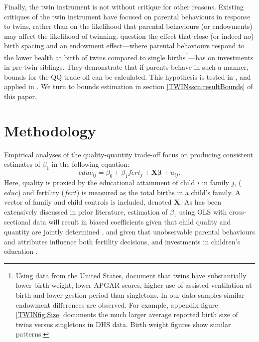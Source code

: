Finally, the twin instrument is not without critique for other reasons. Existing
critiques of the twin instrument have focused on parental behaviours in response 
to twins, rather than on the likelihood that parental behaviours (or endowments) 
may affect the likelihood of twinning. \citet{RosenzweigZhang2009} question the 
effect that close (or indeed no) birth spacing and an endowment effect---where 
parental behaviours respond to the lower health at birth of twins compared to 
single births\footnote{Using data from the United States, \citet{Almondetal2005} 
document that twins have substantially lower birth weight, lower APGAR scores, 
higher use of assisted ventilation at birth and lower gestion period than 
singletons. In our data samples similar endowment differences are observed. For
example, appendix figure \ref{TWINfig:Size} documents the much larger average 
reported birth size of twins versus singletons in DHS data. Birth weight figures 
show similar patterns.}---has on investments in pre-twin siblings. They 
demonstrate that if parents behave in such a manner, bounds for the QQ 
trade-off can be calculated. This hypothesis is tested in 
\citet{Angristetal2010}, and applied in \citet{FitzsimonsMalde2014}.  We turn
to bounds estimation in section \ref{TWINsscn:resultBounds} of this paper.

\section{Methodology}                              \label{TWINscn:method}
Empirical analyses of the quality-quantity trade-off focus on producing 
consistent estimates of $\beta_1$ in the following equation:
\begin{equation}
\label{TWINeqn:RF}
educ_{ij}=\beta_0+\beta_1 fert_{j} + \bm{X}\bm{\beta}+u_{ij}.
\end{equation}
Here, quality is proxied by the educational attainment of child $i$ in family 
$j$, ($educ$) and fertility ($fert$) is measured as the total births in a child's
family.  A vector of family and child controls is included, denoted $\bm{X}$.  As
has been extensively discussed in prior literature, estimation of $\beta_1$ using
OLS with cross-sectional data will result in biased coefficients given that child 
quality and quantity are jointly determined \citep{BeckerLewis1973,
BeckerTomes1976}, and given that unobservable parental behaviours and attributes 
influence both fertility decisions, and investments in children's education 
\citep{Qian2009}.  

